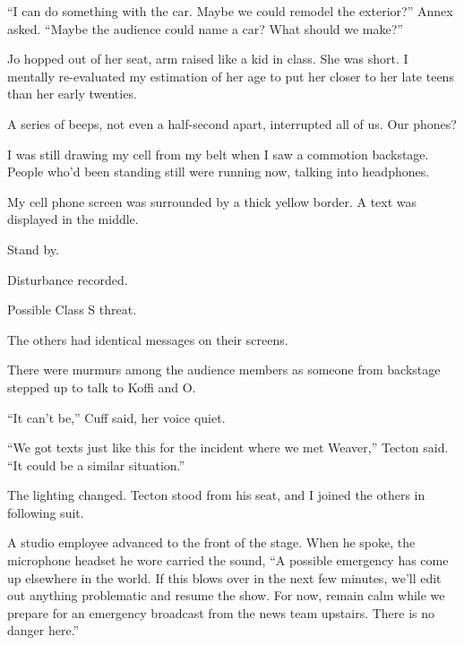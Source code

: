 ``I can do something with the car.  Maybe we could remodel the exterior?'' Annex asked.  ``Maybe the audience could name a car?  What should we make?''



Jo hopped out of her seat, arm raised like a kid in class.  She was short.  I mentally re-evaluated my estimation of her age to put her closer to her late teens than her early twenties.



A series of beeps, not even a half-second apart, interrupted all of us.  Our phones?



I was still drawing my cell from my belt when I saw a commotion backstage.  People who'd been standing still were running now, talking into headphones.



My cell phone screen was surrounded by a thick yellow border.  A text was displayed in the middle.



Stand by.



Disturbance recorded.



Possible Class S threat.



The others had identical messages on their screens.



There were murmurs among the audience members as someone from backstage stepped up to talk to Koffi and O.



``It can't be,'' Cuff said, her voice quiet.



``We got texts just like this for the incident where we met Weaver,'' Tecton said.  ``It could be a similar situation.''



The lighting changed.  Tecton stood from his seat, and I joined the others in following suit.



A studio employee advanced to the front of the stage.  When he spoke, the microphone headset he wore carried the sound, ``A possible emergency has come up elsewhere in the world.  If this blows over in the next few minutes, we'll edit out anything problematic and resume the show.  For now, remain calm while we prepare for an emergency broadcast from the news team upstairs.  There is no danger here.''



